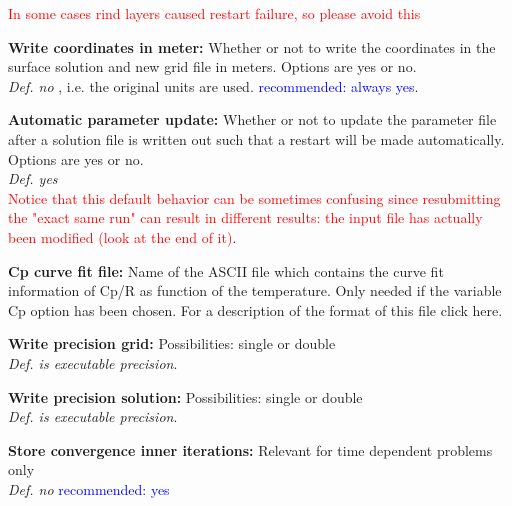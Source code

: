 \documentclass[12pt,epsf,colordvi]{article}
\begin{document}
\begin{description}
\textcolor{red}{In some cases rind layers caused restart failure, so please avoid this }
%
     \item{\bf Write coordinates in meter: }Whether or not to write the coordinates in the surface solution and new grid file in meters. Options are yes or no. \\ 
	{\it Def. no} , i.e. the original units are used. \textcolor{blue}{recommended: always yes}.
%
     \item{\bf Automatic parameter update:} Whether or not to update the parameter file after a solution file is written out such that a restart will be made automatically. Options are yes or no. \\ 
	{\it Def. yes} \\
\textcolor{red}{Notice that this default behavior can be sometimes confusing since resubmitting the "exact same run" can result in different results: the input file has actually been modified (look at the end of it)}.
%
     \item{\bf Cp curve fit file:} Name of the ASCII file which contains the curve fit information of Cp/R as function of the temperature. Only needed if the variable Cp option has been chosen. For a description of the format of this file click here. 
%
      \item{\bf  Write precision grid: } Possibilities: single or double  \\
       {\it Def. is executable precision}.
%
     \item{ \bf Write precision solution: } Possibilities: single or double  \\
       {\it Def. is executable precision}. 
%
      \item{\bf Store convergence inner iterations: } Relevant for time dependent problems only \\
	{\it Def. no}  \textcolor{blue}{recommended: yes}
%
\end{description}

\noindent 
\end{document}
